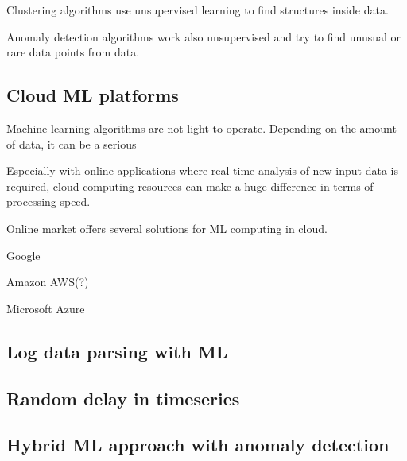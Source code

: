 \documentclass[english, 12pt, a4paper, elec, utf8, a-1b, online]{aaltothesis}
\begin{document}
Clustering algorithms use unsupervised learning
to find structures inside data.

Anomaly detection algorithms work also unsupervised
and try to find unusual or rare data points from data.


\subsection*{Cloud ML platforms}\label{subsec:bg-cloud-ml-platforms}

Machine learning algorithms are not light to operate.
Depending on the amount of data,
it can be a serious %

Especially with online applications
where real time analysis of new input data is required,
cloud computing resources can make a huge difference
in terms of processing speed. %

Online market offers several solutions for ML computing in cloud.

Google

Amazon AWS(?)

Microsoft Azure


\subsection*{Log data parsing with ML}\label{subsec:log-data-parsing-with-ml}

\subsection*{Random delay in timeseries}\label{subsec:bg-random-delay-in-timeseries}


\subsection*{Hybrid ML approach with anomaly detection}\label{subsec:bg-hybrid-ml-approach-with-anomaly-detection}


\end{document}
